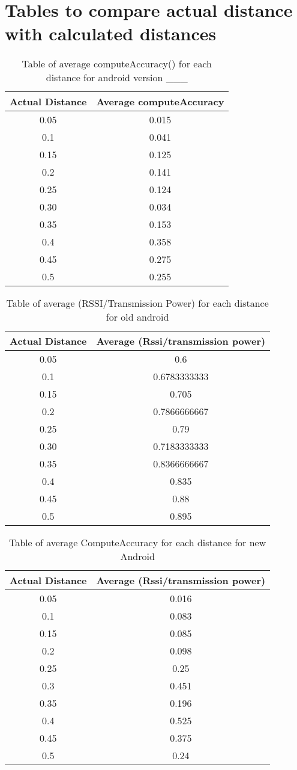 
\section{Tables to compare actual distance with calculated distances}
\begin{table}[H]
\label{tableOfComputeAccuracyOldAndroid}
\begin{tabular}{|c|c|}
\hline 
Actual Distance & Average computeAccuracy\tabularnewline
\hline 
\hline 
0.05 & 0.015\tabularnewline
\hline 
0.1 & 0.041\tabularnewline
\hline 
0.15 & 0.125\tabularnewline
\hline 
0.2 & 0.141\tabularnewline
\hline 
0.25 & 0.124\tabularnewline
\hline 
0.30 & 0.034\tabularnewline
\hline 
0.35 & 0.153\tabularnewline
\hline 
0.4 & 0.358\tabularnewline
\hline 
0.45 & 0.275\tabularnewline
\hline 
0.5 & 0.255\tabularnewline
\hline 
\end{tabular}

\protect\caption{Table of average computeAccuracy() for each distance for android version
\_\_\_}
\end{table}


\begin{table}[H]
\label{tableOfRSSIOldAndroid}
\begin{tabular}{|c|c|}
\hline 
Actual Distance & Average (Rssi/transmission power)\tabularnewline
\hline 
\hline 
0.05 & 0.6\tabularnewline
\hline 
0.1 & 0.6783333333\tabularnewline
\hline 
0.15 & 0.705\tabularnewline
\hline 
0.2 & 0.7866666667\tabularnewline
\hline 
0.25 & 0.79\tabularnewline
\hline 
0.30 & 0.7183333333\tabularnewline
\hline 
0.35 & 0.8366666667\tabularnewline
\hline 
0.4 & 0.835\tabularnewline
\hline 
0.45 & 0.88\tabularnewline
\hline 
0.5 & 0.895\tabularnewline
\hline 
\end{tabular}

\protect\caption{Table of average (RSSI/Transmission Power) for each distance for old android}
\end{table}



\begin{table}[H]
\label{tableOfComputeAccuracyNewAndroid}
\begin{tabular}{|c|c|}
\hline 
Actual Distance & Average (Rssi/transmission power)\tabularnewline
\hline 
\hline 
0.05 & 0.016\tabularnewline
\hline 
0.1 & 0.083\tabularnewline
\hline 
0.15 & 0.085\tabularnewline
\hline 
0.2 & 0.098\tabularnewline
\hline 
0.25 & 0.25\tabularnewline
\hline 
0.3 & 0.451\tabularnewline
\hline 
0.35 & 0.196\tabularnewline
\hline 
0.4 & 0.525\tabularnewline
\hline 
0.45 & 0.375\tabularnewline
\hline 
0.5 & 0.24\tabularnewline
\hline 
\end{tabular}

\protect\caption{Table of average ComputeAccuracy for each distance for new Android}
\end{table}

